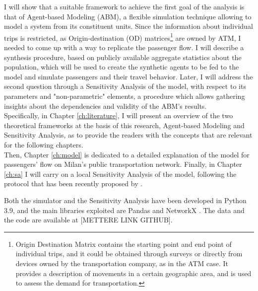 I will show that a suitable framework to achieve the first goal of the analysis is that of Agent-based Modeling (ABM), a flexible simulation technique allowing to model a system from its constituent units. Since the information about individual trips is restricted, as Origin-destination (OD) matrices\footnote{Origin Destination Matrix contains the starting point and end point of individual trips, and it could be obtained through surveys or directly from devices owned by the transportation company, as in the ATM case. It provides a description of movements in a certain geographic area, and is used to assess the demand for transportation.} are owned by ATM, I needed to come up with a way to replicate the passenger flow. I will describe a synthesis procedure, based on publicly available aggregate statistics about the population, which will be used to create the synthetic agents to be fed to the model and simulate passengers and their travel behavior. Later, I will address the second question through a Sensitivity Analysis of the model, with respect to its parameters and "non-parametric" elements, a procedure which allows gathering insights about the dependencies and validity of the ABM's results. \\ 
Specifically, in Chapter \ref{ch:literature}, I will present an overview of the two theoretical frameworks at the basis of this research, Agent-based Modeling and Sensitivity Analysis, as to provide the readers with the concepts that are relevant for the following chapters. \\ Then, Chapter \ref{ch:model} is dedicated to a detailed explanation of the model for passengers' flow on Milan's public transportation network. Finally, in Chapter \ref{ch:sa} I will carry on a local Sensitivity Analysis of the model, following the protocol that has been recently proposed by \textcite{Borgonovo2022SensitivityAO}.

Both the simulator and the Sensitivity Analysis have been developed in Python 3.9, and the main libraries exploited are Pandas \cite{mckinney-proc-scipy-2010} and NetworkX \cite{SciPyProceedings_11}. The data and the code are available at [METTERE LINK GITHUB].